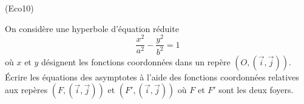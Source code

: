 \begin{tiny}(Eco10)\end{tiny} On considère une hyperbole d'équation réduite
\begin{displaymath}
 \frac{x^2}{a^2}-\frac{y^2}{b^2}=1
\end{displaymath}
où $x$ et $y$ désignent les fonctions coordonnées dans un repère $(O,(\overrightarrow i, \overrightarrow j))$. \'Ecrire les équations des asymptotes à l'aide des fonctions coordonnées relatives aux repères $(F,(\overrightarrow i, \overrightarrow j))$ et $(F',(\overrightarrow i, \overrightarrow j))$ où $F$ et $F'$ sont les deux foyers.